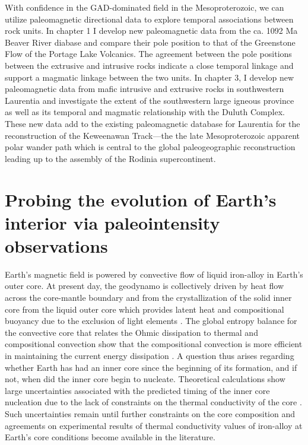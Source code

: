 With confidence in the GAD-dominated field in the Mesoproterozoic, we can utilize paleomagnetic directional data to explore temporal associations between rock units. In chapter 1 I develop new paleomagnetic data from the ca. 1092 Ma Beaver River diabase and compare their pole position to that of the Greenstone Flow of the Portage Lake Volcanics. The agreement between the pole positions between the extrusive and intrusive rocks indicate a close temporal linkage and support a magmatic linkage between the two units. In chapter 3, I develop new paleomagnetic data from mafic intrusive and extrusive rocks in southwestern Laurentia and investigate the extent of the southwestern large igneous province as well as its temporal and magmatic relationship with the Duluth Complex. These new data add to the existing paleomagnetic database for Laurentia for the reconstruction of the Keweenawan Track---the the late Mesoproterozoic apparent polar wander path which is central to the global paleogeographic reconstruction  leading up to the assembly of the Rodinia supercontinent. 

\section{Probing the evolution of Earth's interior via paleointensity observations}

Earth's magnetic field is powered by convective flow of liquid iron-alloy in Earth's outer core. At present day, the geodynamo is collectively driven by heat flow across the core-mantle boundary and from the crystallization of the solid inner core from the liquid outer core which provides latent heat and compositional buoyancy due to the exclusion of light elements \citep{Buffett2000a}. The global entropy balance for the convective core that relates the Ohmic dissipation to thermal and compositional convection show that the compositional convection is more efficient in maintaining the current energy dissipation \citep{Labrosse2003a, Landeau2022a}. A question thus arises regarding whether Earth has had an inner core since the beginning of its formation, and if not, when did the inner core begin to nucleate. Theoretical calculations show large uncertainties associated with the predicted timing of the inner core nucleation \citep[e.g.][]{Buffett2003a, Pozzo2012a, Nimmo2015a} due to the lack of constraints on the thermal conductivity of the core \citep{Gubbins2004a, Konopkova2016a, Ohta2016a}. Such uncertainties remain until further constraints on the core composition and agreements on experimental results of thermal conductivity values of iron-alloy at Earth's core conditions become available in the literature. 

